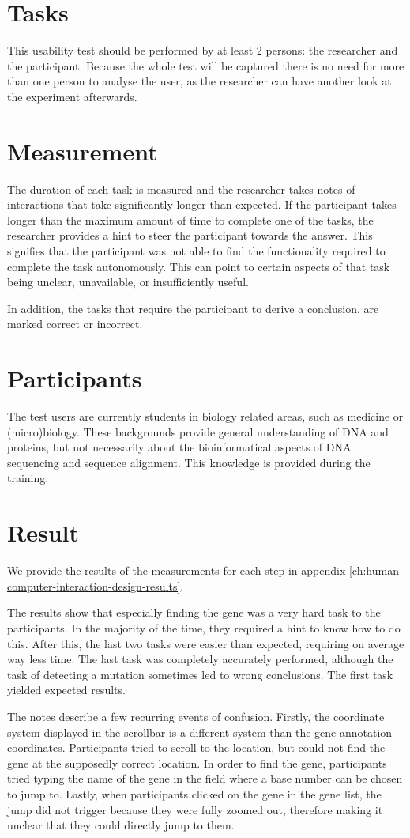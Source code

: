 \section{Tasks}
This usability test should be performed by at least 2 persons: the researcher and the participant. Because the whole test will be captured there is no need for more than one person to analyse the user, as the researcher can have another look at the experiment afterwards.
\section{Measurement}
The duration of each task is measured and the researcher takes notes of interactions that take significantly longer than expected. If the participant takes longer than the maximum amount of time to complete one of the tasks, the researcher provides a hint to steer the participant towards the answer. This signifies that the participant was not able to find the functionality required to complete the task autonomously. This can point to certain aspects of that task being unclear, unavailable, or insufficiently useful.
\par
In addition, the tasks that require the participant to derive a conclusion, are marked correct or incorrect.

\section{Participants}
The test users are currently students in biology related areas, such as medicine or (micro)biology. These backgrounds provide general understanding of DNA and proteins, but not necessarily about the bioinformatical aspects of DNA sequencing and sequence alignment. This knowledge is provided during the training.
\section{Result}
We provide the results of the measurements for each step in appendix \ref{ch:human-computer-interaction-design-results}. 
\par
The results show that especially finding the gene was a very hard task to the participants. In the majority of the time, they required a hint to know how to do this. After this, the last two tasks were easier than expected, requiring on average way less time. The last task was completely accurately performed, although the task of detecting a mutation sometimes led to wrong conclusions. The first task yielded expected results.
\par
The notes describe a few recurring events of confusion. Firstly, the coordinate system displayed in the scrollbar is a different system than the gene annotation coordinates. Participants tried to scroll to the location, but could not find the gene at the supposedly correct location. In order to find the gene, participants tried typing the name of the gene in the field where a base number can be chosen to jump to. Lastly, when participants clicked on the gene in the gene list, the jump did not trigger because they were fully zoomed out, therefore making it unclear that they could directly jump to them.

